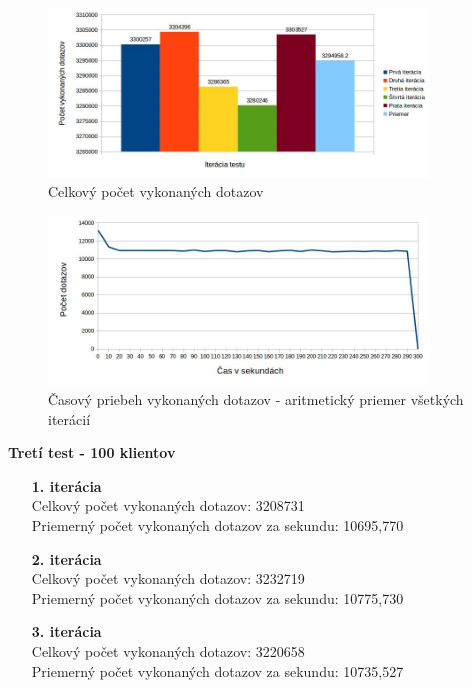 \documentclass[12pt,oneside,final]{fithesis-utf8}
\begin{document}
\begin{itemize}
\begin{itemize}
\end{itemize}

\begin{figure}[H]
  \centering
      \includegraphics[width=0.9\textwidth]{faban2_2.jpg}
  \caption{Celkový počet vykonaných dotazov}
\end{figure}

\begin{figure}[H]
  \centering
      \includegraphics[width=0.9\textwidth]{faban2_2_distr.jpg}
  \caption{Časový priebeh vykonaných dotazov - aritmetický priemer všetkých iterácií}
\end{figure}

\textbf{Tretí test - 100 klientov}
\begin{itemize}

\item[\textbf{1. iterácia}]\ \\
Celkový počet vykonaných dotazov: 3208731\\
Priemerný počet vykonaných dotazov za sekundu: 10695,770

\item[\textbf{2. iterácia}]\ \\
Celkový počet vykonaných dotazov: 3232719\\
Priemerný počet vykonaných dotazov za sekundu: 10775,730

\item[\textbf{3. iterácia}]\ \\
Celkový počet vykonaných dotazov: 3220658\\
Priemerný počet vykonaných dotazov za sekundu: 10735,527


\end{itemize}
\end{itemize}
\end{document}
